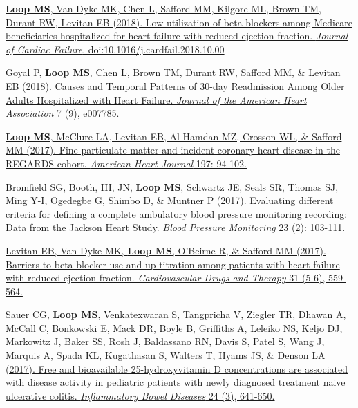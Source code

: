 \documentclass[10pt,letterpaper]{article}
\begin{document}
\begin{etaremune}
\item  \href{https://www.sciencedirect.com/science/article/abs/pii/S1071916418311072}{\textbf{Loop MS}, Van Dyke MK, Chen L, Safford MM, Kilgore ML, Brown TM, Durant RW, Levitan EB (2018). Low utilization of beta blockers among Medicare beneficiaries hospitalized for heart failure with reduced ejection fraction. \emph{Journal of Cardiac
Failure}. doi:10.1016/j.cardfail.2018.10.00}

\item \href{https://www.ahajournals.org/doi/full/10.1161/JAHA.117.007785}{Goyal P, \textbf{Loop MS}, Chen L, Brown TM, Durant RW, Safford MM, \& Levitan EB (2018).  Causes and Temporal Patterns of 30-day Readmission Among Older Adults Hospitalized with Heart Failure. \emph{Journal of the American Heart Association} 7 (9), e007785.}

\item \href{https://www.sciencedirect.com/science/article/pii/S0002870317303630}{\textbf{Loop MS}, McClure LA, Levitan EB, Al-Hamdan MZ, Crosson WL, \& Safford MM (2017). Fine particulate matter and incident coronary heart disease in the REGARDS cohort. \emph{American Heart Journal} 197: 94-102.}

\item \href{https://www.ingentaconnect.com/content/wk/mbp/2018/00000023/00000002/art00007}{Bromfield SG, Booth, III, JN, \textbf{Loop MS}, Schwartz JE, Seals SR, Thomas SJ, Ming Y-I, Ogedegbe G, Shimbo D, \& Muntner P (2017). Evaluating different criteria for defining a complete ambulatory blood pressure monitoring recording: Data from the Jackson Heart Study. \emph{Blood Pressure Monitoring} 23 (2): 103-111.}

\item \href{https://link.springer.com/article/10.1007/s10557-017-6764-8}{Levitan EB, Van Dyke MK, \textbf{Loop MS}, O'Beirne R, \& Safford MM (2017). Barriers to beta-blocker use and up-titration among patients with heart failure with reduced ejection fraction. \emph{Cardiovascular Drugs and Therapy} 31 (5-6), 559-564.}

\item \href{https://academic.oup.com/ibdjournal/article/24/3/641/4863703}{Sauer CG, \textbf{Loop MS}, Venkatexwaran S, Tangpricha V, Ziegler TR, Dhawan A, McCall C, Bonkowski E, Mack DR, Boyle B, Griffiths A, Leleiko NS, Keljo DJ, Markowitz J, Baker SS, Rosh J, Baldassano RN, Davis S, Patel S, Wang J, Marquis A, Spada KL, Kugathasan S, Walters T, Hyams JS, \& Denson LA (2017). Free and bioavailable 25-hydroxyvitamin D concentrations are associated with disease activity in pediatric patients with newly diagnosed treatment naive ulcerative colitis. \emph{Inflammatory Bowel Diseases} 24 (3), 641-650.}


\end{etaremune}
\end{document}
